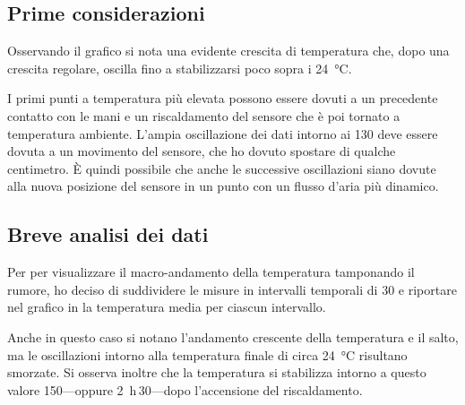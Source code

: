         \subsection{Prime considerazioni}
            Osservando il grafico si nota una evidente crescita di temperatura che, dopo una crescita regolare, oscilla fino a stabilizzarsi poco sopra i \SI{24}{\celsius}.
            
            I primi punti a temperatura più elevata possono essere dovuti a un precedente contatto con le mani e un riscaldamento del sensore che è poi tornato a temperatura ambiente. L'ampia oscillazione dei dati intorno ai \SI{130}{\min} deve essere dovuta a un movimento del sensore, che ho dovuto spostare di qualche centimetro. È quindi possibile che anche le successive oscillazioni siano dovute alla nuova posizione del sensore in un punto con un flusso d'aria più dinamico.

        \subsection{Breve analisi dei dati}
            Per per visualizzare il macro-andamento della temperatura tamponando il rumore, ho deciso di suddividere le misure in intervalli temporali di \SI{30}{\min} e riportare nel grafico in  la temperatura media per ciascun intervallo.

            Anche in questo caso si notano l'andamento crescente della temperatura e il salto, ma le oscillazioni intorno alla temperatura finale di circa \SI{24}{\celsius} risultano smorzate. Si osserva inoltre che la temperatura si stabilizza intorno a questo valore \SI{150}{\min}---oppure  \SI{2}{\hour}\,\SI{30}{\min}---dopo l'accensione del riscaldamento.
            
